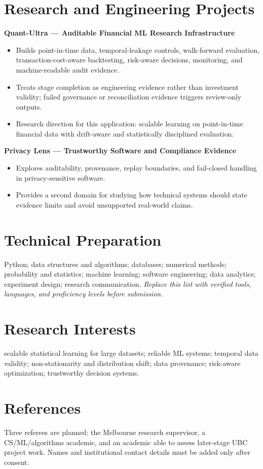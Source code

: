\documentclass[11pt]{article}
\begin{document}
\section*{Research and Engineering Projects}
\textbf{Quant-Ultra --- Auditable Financial ML Research Infrastructure}
\begin{itemize}
\item Builds point-in-time data, temporal-leakage controls, walk-forward evaluation, transaction-cost-aware backtesting, risk-aware decisions, monitoring, and machine-readable audit evidence.
\item Treats stage completion as engineering evidence rather than investment validity; failed governance or reconciliation evidence triggers review-only outputs.
\item Research direction for this application: scalable learning on point-in-time financial data with drift-aware and statistically disciplined evaluation.
\end{itemize}

\begin{samepage}
\textbf{Privacy Lens --- Trustworthy Software and Compliance Evidence}
\begin{itemize}
\item Explores auditability, provenance, replay boundaries, and fail-closed handling in privacy-sensitive software.
\item Provides a second domain for studying how technical systems should state evidence limits and avoid unsupported real-world claims.
\end{itemize}
\end{samepage}

\section*{Technical Preparation}
Python; data structures and algorithms; databases; numerical methods; probability and statistics; machine learning; software engineering; data analytics; experiment design; research communication. \textit{Replace this list with verified tools, languages, and proficiency levels before submission.}

\section*{Research Interests}
scalable statistical learning for large datasets; reliable ML systems; temporal data validity; non-stationarity and distribution shift; data provenance; risk-aware optimization; trustworthy decision systems.

\section*{References}
Three referees are planned: the Melbourne research supervisor, a CS/ML/algorithms academic, and an academic able to assess later-stage UBC project work. Names and institutional contact details must be added only after consent.
\end{document}
